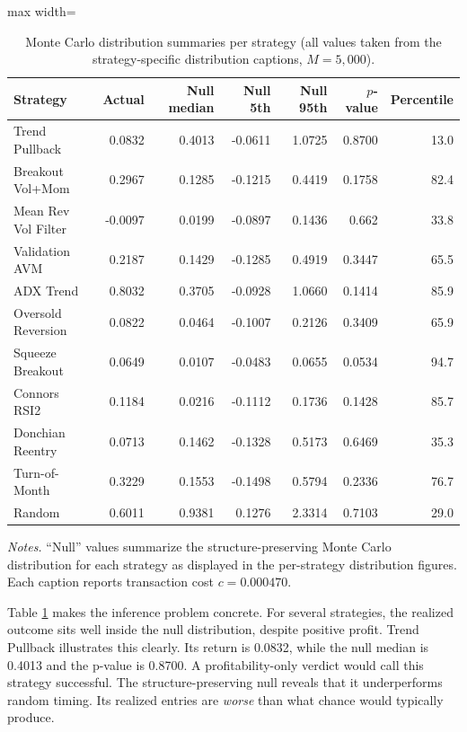 \documentclass[preprint,12pt]{elsarticle}
\theoremstyle{definition}
\begin{document}
\clearpage
\begin{table}[p]
\centering
\caption{Monte Carlo distribution summaries per strategy (all values taken from the strategy-specific distribution captions, $M=5{,}000$).}
\label{tab:mc}
{\small
\renewcommand{\arraystretch}{1.15}
\setlength{\tabcolsep}{6pt}
\begin{adjustbox}{max width=\textwidth}
\begin{tabular}{@{}lrrrrrr@{}}
\toprule
Strategy & Actual & Null median & Null 5th & Null 95th & $p$-value & Percentile \\
\midrule
Trend Pullback      & 0.0832 & 0.4013 & -0.0611 & 1.0725 & 0.8700 & 13.0 \\
Breakout Vol+Mom    & 0.2967 & 0.1285 & -0.1215 & 0.4419 & 0.1758 & 82.4 \\
Mean Rev Vol Filter & -0.0097 & 0.0199 & -0.0897 & 0.1436 & 0.662\phantom{0} & 33.8 \\
Validation AVM      & 0.2187 & 0.1429 & -0.1285 & 0.4919 & 0.3447 & 65.5 \\
ADX Trend           & 0.8032 & 0.3705 & -0.0928 & 1.0660 & 0.1414 & 85.9 \\
Oversold Reversion  & 0.0822 & 0.0464 & -0.1007 & 0.2126 & 0.3409 & 65.9 \\
Squeeze Breakout    & 0.0649 & 0.0107 & -0.0483 & 0.0655 & 0.0534 & 94.7 \\
Connors RSI2        & 0.1184 & 0.0216 & -0.1112 & 0.1736 & 0.1428 & 85.7 \\
Donchian Reentry    & 0.0713 & 0.1462 & -0.1328 & 0.5173 & 0.6469 & 35.3 \\
Turn-of-Month       & 0.3229 & 0.1553 & -0.1498 & 0.5794 & 0.2336 & 76.7 \\
Random              & 0.6011 & 0.9381 & \phantom{-}0.1276 & 2.3314 & 0.7103 & 29.0 \\
\bottomrule
\end{tabular}
\end{adjustbox}
}
\par\vspace{0.75em}
\begin{minipage}{0.95\textwidth}
\centering
\footnotesize\emph{Notes.} ``Null'' values summarize the structure-preserving Monte Carlo distribution for each strategy as displayed in the per-strategy distribution figures. Each caption reports transaction cost $c=0.000470$.
\end{minipage}
\end{table}
\clearpage

Table \ref{tab:mc} makes the inference problem concrete. For several strategies, the realized outcome sits well inside the null distribution, despite positive profit. Trend Pullback illustrates this clearly. Its return is 0.0832, while the null median is 0.4013 and the p-value is 0.8700. A profitability-only verdict would call this strategy successful. The structure-preserving null reveals that it underperforms random timing. Its realized entries are \emph{worse} than what chance would typically produce.
\end{document}
